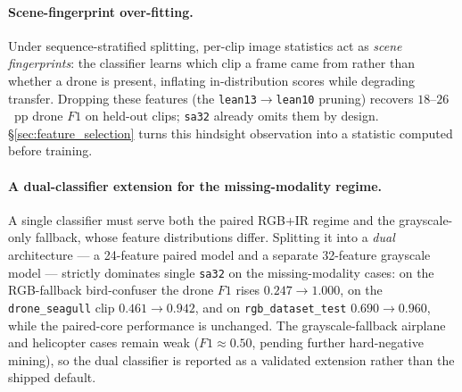 \paragraph{Scene-fingerprint over-fitting.}
Under sequence-stratified splitting, per-clip image statistics act as \emph{scene fingerprints}: the classifier learns which clip a frame came from rather than whether a drone is present, inflating in-distribution scores while degrading transfer. Dropping these features (the \texttt{lean13}$\to$\texttt{lean10} pruning) recovers $18$--$26$~pp drone $F1$ on held-out clips; \texttt{sa32} already omits them by design. \S\ref{sec:feature_selection} turns this hindsight observation into a statistic computed before training.

\paragraph{A dual-classifier extension for the missing-modality regime.}
A single classifier must serve both the paired RGB+IR regime and the grayscale-only fallback, whose feature distributions differ. Splitting it into a \emph{dual} architecture --- a 24-feature paired model and a separate 32-feature grayscale model --- strictly dominates single \texttt{sa32} on the missing-modality cases: on the RGB-fallback bird-confuser the drone $F1$ rises $0.247\to1.000$, on the \texttt{drone\_seagull} clip $0.461\to0.942$, and on \texttt{rgb\_dataset\_test} $0.690\to0.960$, while the paired-core performance is unchanged. The grayscale-fallback airplane and helicopter cases remain weak ($F1\approx0.50$, pending further hard-negative mining), so the dual classifier is reported as a validated extension rather than the shipped default.

